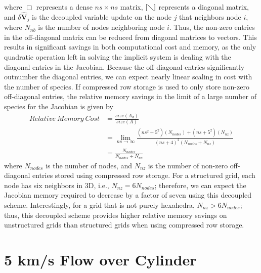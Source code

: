 where $\Box$ represents a dense $ns \times ns$ matrix, $[\diagdown]$ represents
a diagonal matrix, and $\delta \mathbf{\hat{V}}_j$  is the decoupled variable
update on the node $j$ that neighbors node $i$, where $N_{nb}$ is the number of
nodes neighboring node $i$.  Thus, the non-zero entries in the off-diagonal
matrix can be reduced from diagonal matrices to vectors.  This results in
significant savings in both computational cost and memory, as the only quadratic
operation left in solving the implicit system is dealing with the diagonal
entries in the Jacobian.  Because the off-diagonal entries significantly
outnumber the diagonal entries, we can expect nearly linear scaling in cost with
the number of species.  If compressed row storage\cite{George} is used to
only store non-zero off-diagonal entries, the relative memory savings in the
limit of a large number of species for the Jacobian is given by
\begin{equation}
  \label{mem_req_eq}
  \begin{split} 
    Relative\ Memory\ Cost &=
    \frac{size(A_d)}{size(A)} \\ &= \lim_{ns\to\infty}
    \frac{(ns^2+5^2)(N_{nodes})+(ns+5^2)(N_{nz})}{(ns+4)^2(N_{nodes}+N_{nz})} \\
    &= \frac{N_{nodes}}{N_{nodes} + N_{nz}}
  \end{split}
\end{equation}
where $N_{nodes}$ is the number of nodes, and $N_{nz}$ is the number of non-zero
off-diagonal entries stored using compressed row storage. For a structured grid,
each node has six neighbors in 3D, i.e., $N_{nz} = 6N_{nodes}$; therefore, we can
expect the Jacobian memory required to decrease by a factor of seven using this
decoupled scheme. Interestingly, for a grid that is not purely hexahedra,
$N_{nz} > 6N_{nodes}$; thus, this decoupled scheme provides higher relative
memory savings on unstructured grids than structured grids when using compressed
row storage.

\section{5 km/s Flow over Cylinder}

